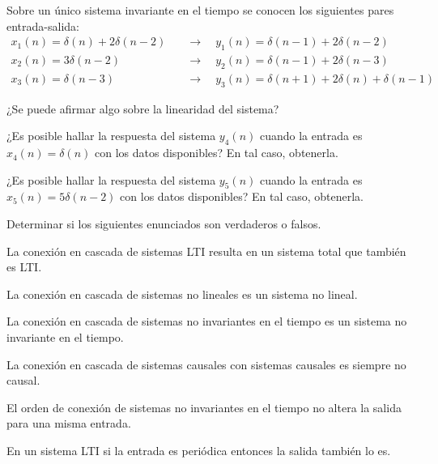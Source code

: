\begin{ejercicio}
    Sobre un único sistema invariante en el tiempo se conocen los siguientes pares entrada-salida:
    \begin{align*}
        x_1(n) = \delta(n) + 2\delta(n-2) & \hspace{1em}\longrightarrow\hspace{1em} y_1(n) = \delta(n-1) + 2\delta(n-2) \\[.5em]
        x_2(n) = 3 \delta(n-2) & \hspace{1em}\longrightarrow\hspace{1em} y_2(n) = \delta(n-1) + 2 \delta(n-3) \\[.5em]
        x_3(n) = \delta(n-3) & \hspace{1em}\longrightarrow\hspace{1em} y_3(n) = \delta(n+1) + 2 \delta(n) + \delta(n-1)
    \end{align*}
    
    \inciso ¿Se puede afirmar algo sobre la linearidad del sistema?
    
    \inciso ¿Es posible hallar la respuesta del sistema $y_4(n)$ cuando la entrada es $x_4(n)=\delta(n)$ con los datos disponibles? En tal caso, obtenerla.
    
    \inciso ¿Es posible hallar la respuesta del sistema $y_5(n)$ cuando la entrada es $x_5(n)=5\delta(n-2)$ con los datos disponibles? En tal caso, obtenerla.
\end{ejercicio}

\begin{ejercicio}
    Determinar si los siguientes enunciados son verdaderos o falsos.
    
    \inciso La conexión en cascada de sistemas LTI resulta en un sistema total que también es LTI.
    
    \inciso La conexión en cascada de sistemas no lineales es un sistema no lineal.
    
    \inciso La conexión en cascada de sistemas no invariantes en el tiempo es un sistema no invariante en el tiempo.
    
    \inciso La conexión en cascada de sistemas causales con sistemas causales es siempre no causal.
    
    \inciso El orden de conexión de sistemas no invariantes en el tiempo no altera la salida para una misma entrada.
    
    \inciso En un sistema LTI si la entrada es periódica entonces la salida también lo es.
\end{ejercicio}
    
